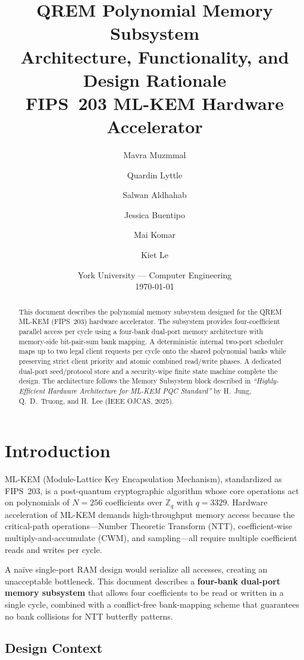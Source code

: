 \documentclass[11pt,letterpaper]{article}
\title{%
  \textbf{QREM Polynomial Memory Subsystem}\\[0.4em]
  \large Architecture, Functionality, and Design Rationale\\[0.4em]
  \normalsize FIPS~203 ML-KEM Hardware Accelerator
}
\author{
  Mavra Muzmmal \and Quardin Lyttle \and Salwan Aldhahab \and
  Jessica Buentipo \and Mai Komar \and Kiet Le
}
\date{York University — Computer Engineering\\[0.3em]\today}
\begin{document}
\maketitle
\thispagestyle{fancy}

\begin{abstract}
This document describes the polynomial memory subsystem designed for the
QREM ML-KEM (FIPS~203) hardware accelerator. The subsystem provides
four-coefficient parallel access per cycle using a four-bank dual-port
memory architecture with memory-side bit-pair-sum bank mapping. A
deterministic internal two-port scheduler maps up to two legal
client requests per cycle onto the shared polynomial banks while preserving
strict client priority and atomic combined read/write phases. A dedicated
dual-port seed/protocol store and a security-wipe finite state machine
complete the design. The
architecture follows the Memory Subsystem block described in
\emph{``Highly-Efficient Hardware Architecture for ML-KEM PQC Standard''}
by H.~Jung, Q.~D.~Truong, and H.~Lee (IEEE OJCAS, 2025).
\end{abstract}

\tableofcontents
\newpage

\section{Introduction}
\label{sec:intro}

ML-KEM (Module-Lattice Key Encapsulation Mechanism), standardized as
FIPS~203, is a post-quantum cryptographic algorithm whose core operations
act on polynomials of $N=256$ coefficients over $\mathbb{Z}_q$ with
$q=3329$. Hardware acceleration of ML-KEM demands high-throughput memory
access because the critical-path operations---Number Theoretic Transform
(NTT), coefficient-wise multiply-and-accumulate (CWM), and sampling---all
require multiple coefficient reads and writes per cycle.

A na\"ive single-port RAM design would serialize all accesses, creating an
unacceptable bottleneck. This document describes a \textbf{four-bank
dual-port memory subsystem} that allows four coefficients to be read or
written in a single cycle, combined with a conflict-free bank-mapping
scheme that guarantees no bank collisions for NTT butterfly patterns.

\subsection{Design Context}
\end{document}
